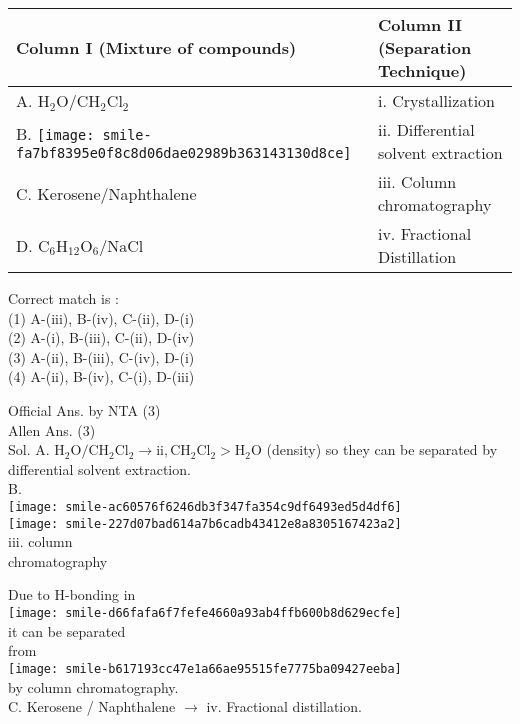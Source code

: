 \documentclass[10pt]{article}
\begin{document}
\begin{center}
\begin{tabular}{|l|l|}
\hline
Column I (Mixture of compounds) & Column II (Separation Technique) \\
\hline
A. \(\mathrm{H}_{2} \mathrm{O} / \mathrm{CH}_{2} \mathrm{Cl}_{2}\) & i. Crystallization \\
\hline
B. \texttt{[image: smile-fa7bf8395e0f8c8d06dae02989b363143130d8ce]} & ii. Differential solvent extraction \\
\hline
C. Kerosene/Naphthalene & iii. Column chromatography \\
\hline
D. \(\mathrm{C}_{6} \mathrm{H}_{12} \mathrm{O}_{6} / \mathrm{NaCl}\) & iv. Fractional Distillation \\
\hline
\end{tabular}
\end{center}

Correct match is :\\
(1) A-(iii), B-(iv), C-(ii), D-(i)\\
(2) A-(i), B-(iii), C-(ii), D-(iv)\\
(3) A-(ii), B-(iii), C-(iv), D-(i)\\
(4) A-(ii), B-(iv), C-(i), D-(iii)

Official Ans. by NTA (3)\\
Allen Ans. (3)\\
Sol. A. \(\mathrm{H}_{2} \mathrm{O} / \mathrm{CH}_{2} \mathrm{Cl}_{2} \rightarrow \mathrm{ii}, \mathrm{CH}_{2} \mathrm{Cl}_{2}>\mathrm{H}_{2} \mathrm{O}\) (density) so they can be separated by differential solvent extraction.\\
B.\\
\texttt{[image: smile-ac60576f6246db3f347fa354c9df6493ed5d4df6]}\\
\texttt{[image: smile-227d07bad614a7b6cadb43412e8a8305167423a2]}\\
iii. column\\
chromatography

Due to H-bonding in\\
\texttt{[image: smile-d66fafa6f7fefe4660a93ab4ffb600b8d629ecfe]}\\
it can be separated\\
from\\
\texttt{[image: smile-b617193cc47e1a66ae95515fe7775ba09427eeba]}\\
by column chromatography.\\
C. Kerosene / Naphthalene \(\rightarrow\) iv. Fractional distillation.
\end{document}
